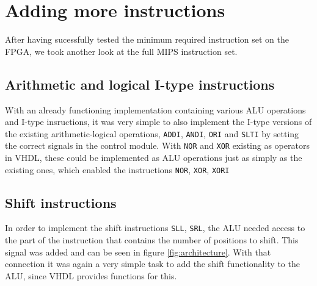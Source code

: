 \section{Adding more instructions}
\label{sec:more_instructions}
After having sucessfully tested the minimum required instruction set on the FPGA,
we took another look at the full MIPS instruction set.

\subsection{Arithmetic and logical I-type instructions}
With an already functioning implementation containing various ALU operations and I-type insructions,
it was very simple to also implement the I-type versions of the existing arithmetic-logical operations, \texttt{ADDI}, \texttt{ANDI}, \texttt{ORI} and \texttt{SLTI} by setting the correct signals in the control module.
With \texttt{NOR} and \texttt{XOR} existing as operators in VHDL, these could be implemented as ALU operations just as simply as the existing ones,
which enabled the instructions \texttt{NOR}, \texttt{XOR}, \texttt{XORI}

\subsection{Shift instructions}
In order to implement the shift instructions \texttt{SLL}, \texttt{SRL},
the ALU needed access to the part of the instruction that contains the number of positions to shift.
This signal was added and can be seen in figure \ref{fig:architecture}.
With that connection it was again a very simple task to add the shift functionality to the ALU, since VHDL provides functions for this.
